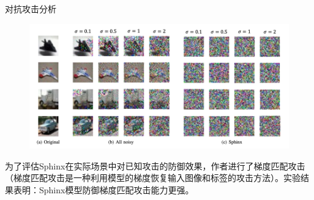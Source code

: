 \documentclass{beamer}
\begin{document}




\begin{frame}{对抗攻击分析}
\begin{figure}[h]
\centering
\includegraphics[height=.6\textheight]{pic/fig9.png}
\end{figure}
{\footnotesize 为了评估Sphinx在实际场景中对已知攻击的防御效果，作者进行了梯度匹配攻击（梯度匹配攻击\cite{zhao2020idlg}是一种利用模型的梯度恢复输入图像和标签的攻击方法）。实验结果表明：Sphinx模型防御梯度匹配攻击能力更强。
}
\end{frame}



\end{document}
